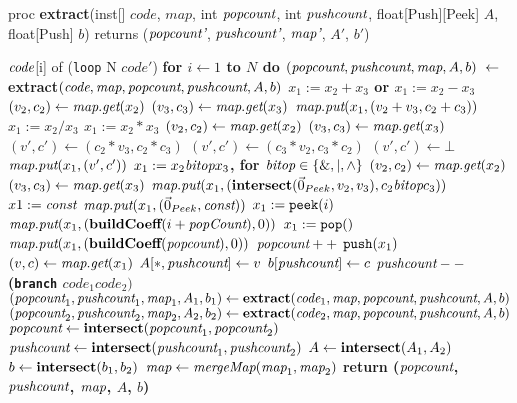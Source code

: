 \begin{algorithm}
proc {\bf extract}(inst[] $code$, \maptype $map$, int $\mbox{\it popcount}$, int $\mbox{\it pushcount}$, 
float[Push][Peek] $A$, float[Push] $b$) 
returns ($\mbox{\it popcount'}$, $\mbox{\it pushcount'}$, $\mbox{\it map'}$, $A'$, $b'$)
\begin{algorithmic}
 $\mbox{\it code}$[i] of
\IND
\STATE ({\tt loop} N $code'$)
\IND
\STATE \bf{for} $i \leftarrow 1$ to $N$ {\bf do}
\IND
\STATE $(\mbox{\it popcount}, \mbox{\it pushcount}, \mbox{\it map}, A, b)~\leftarrow~$ \bf{extract}$(\mbox{\it code}, \mbox{\it map}, \mbox{\it popcount}, \mbox{\it pushcount}, A, b)$
\UND
\UND
\STATE
\STATE $x_1 := x_2 + x_3$ or $x_1 := x_2 - x_3$
\IND
\STATE $(v_2, c_2) \leftarrow \mbox{\it map}.\mbox{\it get}(x_2)$
\STATE $(v_3, c_3) \leftarrow \mbox{\it map}.\mbox{\it get}(x_3)$
\STATE $\mbox{\it map}.\mbox{\it put}(x_1, (v_2+v_3, c_2+c_3))$
\UND
\STATE
\STATE $x_1 := x_2 / x_3$
\STATE
\STATE $x_1 := x_2 * x_3$
\IND
\STATE $(v_2, c_2) \leftarrow \mbox{\it map}.\mbox{\it get}(x_2)$
\STATE $(v_3, c_3) \leftarrow \mbox{\it map}.\mbox{\it get}(x_3)$
\STATE $(v', c') \leftarrow (c_2*v_3, c_2*c_3)$
\STATE $(v', c') \leftarrow (c_3*v_2, c_3*c_2)$
\ELSE
\STATE $(v', c') \leftarrow \bot$
\ENDIF
\STATE $\mbox{\it map}.\mbox{\it put}(x_1, (v', c'))$
\UND
\STATE
\STATE $x_1 := x_2 \mbox{\it bitop} x_3$, for $\mbox{\it bitop} \in \{\&, |, \wedge\}$
\IND
\STATE $(v_2, c_2) \leftarrow \mbox{\it map}.\mbox{\it get}(x_2)$
\STATE $(v_3, c_3) \leftarrow \mbox{\it map}.\mbox{\it get}(x_3)$
\STATE $\mbox{\it map}.\mbox{\it put}(x_1, (\mbox{\bf intersect}(\vec 0_{Peek}, v_2, v_3), c_2 \mbox{\it bitop} c_3))$
\UND
\STATE
\STATE $x1 := \mbox{\it const}$
\IND
\STATE $\mbox{\it map}.\mbox{\it put}(x_1, (\vec 0_{Peek}, \mbox{\it const}))$
\UND
\STATE
\STATE $x_1 := \mbox{\tt peek}(i)$
\IND
\STATE $\mbox{\it map}.\mbox{\it put}(x_1, (\mbox{\bf buildCoeff}(i+\mbox{\it popCount}), 0))$
\UND
\STATE
\STATE $x_1 := \mbox{\tt pop}()$
\IND
\STATE $\mbox{\it map}.\mbox{\it put}(x_1, (\mbox{\bf buildCoeff}(\mbox{\it popcount}), 0))$
\STATE $\mbox{\it popcount}++$
\UND
\STATE
\STATE $\mbox{\tt push}(x_1)$
\IND
\STATE $(v, c) \leftarrow \mbox{\it map}.\mbox{\it get}(x_1)$
\STATE $A[*, \mbox{\it pushcount}] \leftarrow v$
\STATE $b[\mbox{\it pushcount}] \leftarrow c$
\STATE $\mbox{\it pushcount}--$
\UND
\STATE
\STATE ({\tt branch} $code_1 code_2)$
\IND
\STATE $(\mbox{\it popcount}_1, \mbox{\it pushcount}_1, \mbox{\it map}_1, A_1, b_1) \leftarrow {\mbox{\bf extract}}(\mbox{\it code}_1, \mbox{\it map}, \mbox{\it popcount}, \mbox{\it pushcount}, A, b)$
\STATE $(\mbox{\it popcount}_2, \mbox{\it pushcount}_2, \mbox{\it map}_2, A_2, b_2) \leftarrow {\mbox{\bf extract}}(\mbox{\it code}_2, \mbox{\it map}, \mbox{\it popcount}, \mbox{\it pushcount}, A, b)$
\STATE
\STATE $\mbox{\it popcount} \leftarrow {\mbox{\bf intersect}}(\mbox{\it popcount}_1, \mbox{\it popcount}_2)$
\STATE $\mbox{\it pushcount} \leftarrow {\mbox{\bf intersect}}(\mbox{\it pushcount}_1, \mbox{\it pushcount}_2)$
\STATE $A \leftarrow \mbox{\bf intersect}( A_1, A_2 )$
\STATE $b \leftarrow \mbox{\bf intersect}( b_1, b_2 )$
\STATE $\mbox{\it map} \leftarrow \mbox{\it mergeMap}(\mbox{\it map}_1, \mbox{\it map}_2)$
\UND
\UND %
\ENDFOR
\STATE return ($\mbox{\it popcount}$, $\mbox{\it pushcount}$, $\mbox{\it map}$, $A$, $b$)
\end{algorithmic}
\end{algorithm}

